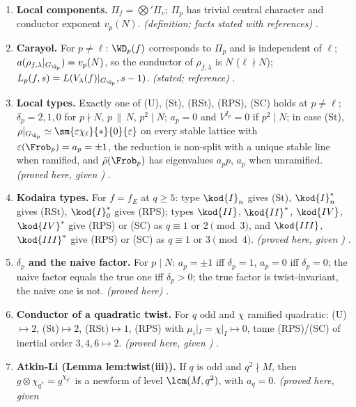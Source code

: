 \begin{enumerate}[label=\textbf{\thechapter.\arabic*}]
twists, preserving conductors and matching principal series, twists of Steinberg and supercuspidals with sums of characters, $\Sp(2)\otimes\mu$ and irreducible
representations. \emph{(stated; reference)} .
\item \textbf{Local components.} $\Pi_f=\bigotimes'\Pi_v$; $\Pi_p$ has trivial central character and conductor exponent $v_p(N)$. \emph{(definition; facts stated with references)}
.
\item \textbf{Carayol.} For $p\ne\ell$: $\WD_p(f)$ corresponds to $\Pi_p$ and is independent of $\ell$; $a(\rho_{f,\lambda}|_{G_{\Q_p}})=v_p(N)$, so the conductor of $\rho_{f,\lambda}$ is $N$
($\ell\nmid N$); $L_p(f,s)=L(V_\lambda(f)|_{G_{\Q_p}},s-1)$. \emph{(stated; reference)} .
\item \textbf{Local types.} Exactly one of (U), (St), (RSt), (RPS), (SC) holds at $p\ne\ell$; $\delta_p=2,1,0$ for $p\nmid N$, $p\,\|\,N$, $p^2\mid N$; $a_p=0$ and $V^{I_p}=0$ if $p^2\mid N$; in case
(St), $\rho|_{G_{\Q_p}}\simeq\sm{\varepsilon\chi_\ell}{*}{0}{\varepsilon}$ on every stable lattice with $\varepsilon(\Frob_p)=a_p=\pm1$, the reduction is non-split with a unique stable line when
ramified, and $\bar\rho(\Frob_p)$ has eigenvalues $a_pp$, $a_p$ when unramified. \emph{(proved here, given )} .
\item \textbf{Kodaira types.} For $f=f_E$ at $q\ge5$: type $\kod{I}_n$ gives (St), $\kod{I}_n^*$ gives (RSt), $\kod{I}_0^*$ gives (RPS); types $\kod{II}$, $\kod{II}^*$, $\kod{IV}$, $\kod{IV}^*$ give (RPS) or (SC) as
$q\equiv1$ or $2\pmod3$, and $\kod{III}$, $\kod{III}^*$ give (RPS) or (SC) as $q\equiv1$ or $3\pmod4$. \emph{(proved here, given )} .
\item \textbf{$\delta_p$ and the naive factor.} For $p\mid N$: $a_p=\pm1$ iff $\delta_p=1$, $a_p=0$ iff $\delta_p=0$; the naive factor equals the true one iff $\delta_p>0$; the true
factor is twist-invariant, the naive one is not. \emph{(proved here)} .
\item \textbf{Conductor of a quadratic twist.} For $q$ odd and $\chi$ ramified quadratic: (U)$\mapsto2$, (St)$\mapsto2$, (RSt)$\mapsto1$, (RPS) with $\mu_i|_{I}=\chi|_I\mapsto0$, tame (RPS)/(SC) of
inertial order $3,4,6\mapsto2$. \emph{(proved here, given )} .
\item \textbf{Atkin-Li (Lemma lem:twist(iii)).} If $q$ is odd and $q^2\nmid M$, then $g\otimes\chi_{q^*}=g^{\chi_{q^*}}$ is a newform of level $\lcm(M,q^2)$, with $a_q=0$. \emph{(proved here, given
}
\end{enumerate}
